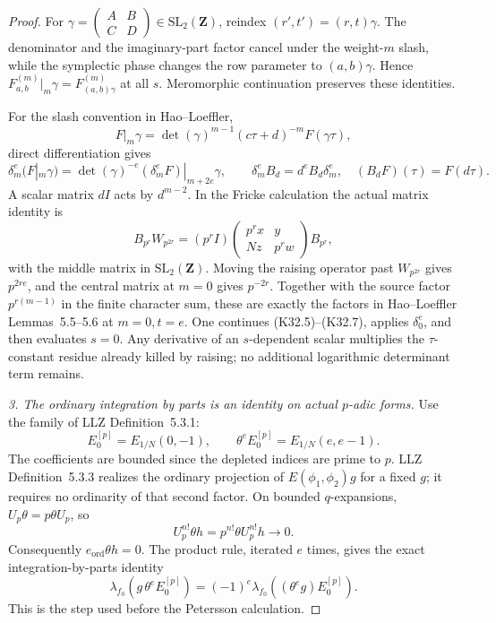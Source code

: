 \begin{proof}
For \(\gamma=\left(\begin{smallmatrix}A&B\\C&D\end{smallmatrix}\right)
\in\mathrm{SL}_2(\mathbf Z)\), reindex
\((r',t')=(r,t)\gamma\).
The denominator and the imaginary-part factor cancel under
the weight-\(m\) slash, while the symplectic phase changes
the row parameter to \((a,b)\gamma\).
Hence
\(F_{a,b}^{(m)}|_m\gamma=F_{(a,b)\gamma}^{(m)}\)
at all \(s\).  Meromorphic continuation preserves these
identities.

For the slash convention in Hao--Loeffler,
\[
 F|_m\gamma=
 \det(\gamma)^{m-1}(c\tau+d)^{-m}F(\gamma\tau),
\]
direct differentiation gives
\[
 \delta_m^e(F|_m\gamma)
  =\det(\gamma)^{-e}
       (\delta_m^eF)|_{m+2e}\gamma,
 \qquad
 \delta_m^e B_d=d^e B_d\delta_m^e,
 \quad (B_dF)(\tau)=F(d\tau).
 \tag{K32.6}
\]
A scalar matrix \(dI\) acts by \(d^{m-2}\).
In the Fricke calculation the actual matrix identity is
\[
 B_{p^r}W_{p^{2r}}
  =(p^r I)
    \begin{pmatrix}p^r x&y\\Nz&p^r w\end{pmatrix}
    B_{p^r},
 \tag{K32.7}
\]
with the middle matrix in \(\mathrm{SL}_2(\mathbf Z)\).
Moving the raising operator past \(W_{p^{2r}}\) gives
\(p^{2re}\), and the central matrix at \(m=0\) gives
\(p^{-2r}\).  Together with the source factor
\(p^{r(m-1)}\) in the finite character sum, these are
exactly the factors in Hao--Loeffler Lemmas~5.5--5.6
at \(m=0,t=e\).
One continues (K32.5)--(K32.7), applies \(\delta_0^e\),
and then evaluates \(s=0\).  Any derivative of an
\(s\)-dependent scalar multiplies the \(\tau\)-constant
residue already killed by raising; no additional logarithmic
determinant term remains.

\emph{3. The ordinary integration by parts is an identity on actual
\(p\)-adic forms.}
Use the family of LLZ Definition~5.3.1:
\[
 E_0^{[p]}=E_{1/N}(0,-1),\qquad
 \theta^e E_0^{[p]}=E_{1/N}(e,e-1).
 \tag{K32.8}
\]
The coefficients are bounded since the depleted indices are
prime to \(p\).  LLZ Definition~5.3.3 realizes the ordinary
projection of \(E(\phi_1,\phi_2)g\) for a fixed \(g\);
it requires no ordinarity of that second factor.
On bounded \(q\)-expansions,
\(U_p\theta=p\theta U_p\), so
\[
 U_p^{n!}\theta h=p^{n!}\theta U_p^{n!}h
       \longrightarrow0.
\]
Consequently \(e_{\mathrm{ord}}\theta h=0\).
The product rule, iterated \(e\) times, gives the exact
integration-by-parts identity
\[
 \lambda_{f_0}(g\,\theta^e E_0^{[p]})
   =(-1)^e\lambda_{f_0}((\theta^e g)E_0^{[p]}).
 \tag{K32.9}
\]
This is the step used before the Petersson calculation.


\end{proof}
